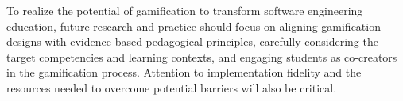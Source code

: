 \documentclass[
	hf,
	]{ceurart}
\begin{document}
To realize the potential of gamification to transform software engineering education, future research and practice should focus on aligning gamification designs with evidence-based pedagogical principles, carefully considering the target competencies and learning contexts, and engaging students as co-creators in the gamification process. Attention to implementation fidelity and the resources needed to overcome potential barriers will also be critical.
	
	
		
		
	
	
	
	
	
	
\end{document}
